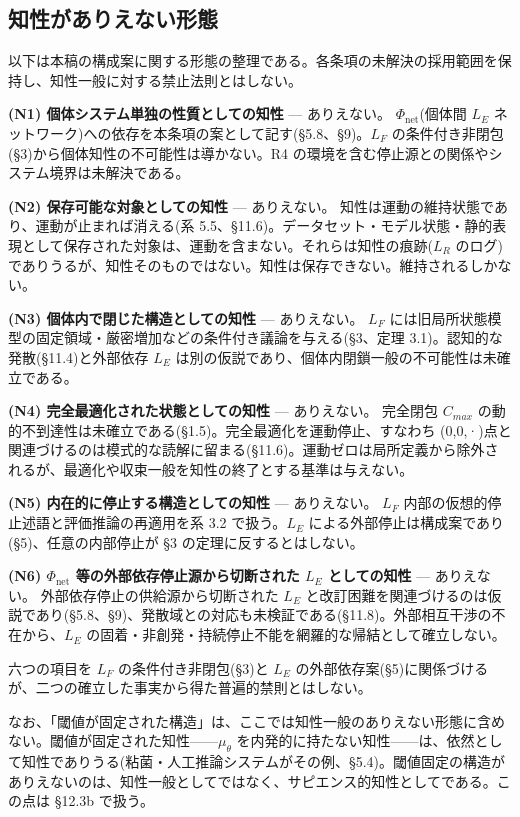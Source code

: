 \bigskip


\subsection{知性がありえない形態}


以下は本稿の構成案に関する形態の整理である。各条項の未解決の採用範囲を保持し、知性一般に対する禁止法則とはしない。

\textbf{(N1) 個体システム単独の性質としての知性} — ありえない。
$\Phi_{\text{net}}$(個体間 $L_E$ ネットワーク)への依存を本条項の案として記す(\S{}5.8、\S{}9)。$L_F$ の条件付き非閉包(\S{}3)から個体知性の不可能性は導かない。R4 の環境を含む停止源との関係やシステム境界は未解決である。

\textbf{(N2) 保存可能な対象としての知性} — ありえない。
知性は運動の維持状態であり、運動が止まれば消える(系 5.5、\S{}11.6)。データセット・モデル状態・静的表現として保存された対象は、運動を含まない。それらは知性の痕跡($L_R$ のログ)でありうるが、知性そのものではない。知性は保存できない。維持されるしかない。

\textbf{(N3) 個体内で閉じた構造としての知性} — ありえない。
$L_F$ には旧局所状態模型の固定領域・厳密増加などの条件付き議論を与える(\S{}3、定理 3.1)。認知的な発散(\S{}11.4)と外部依存 $L_E$ は別の仮説であり、個体内閉鎖一般の不可能性は未確立である。

\textbf{(N4) 完全最適化された状態としての知性} — ありえない。
完全閉包 $C_{max}$ の動的不到達性は未確立である(\S{}1.5)。完全最適化を運動停止、すなわち (0,0,·)点と関連づけるのは模式的な読解に留まる(\S{}11.6)。運動ゼロは局所定義から除外されるが、最適化や収束一般を知性の終了とする基準は与えない。

\textbf{(N5) 内在的に停止する構造としての知性} — ありえない。
$L_F$ 内部の仮想的停止述語と評価推論の再適用を系 3.2 で扱う。$L_E$ による外部停止は構成案であり(\S{}5)、任意の内部停止が \S{}3 の定理に反するとはしない。

\textbf{(N6) $\Phi_{\text{net}}$ 等の外部依存停止源から切断された $L_E$ としての知性} — ありえない。
外部依存停止の供給源から切断された $L_E$ と改訂困難を関連づけるのは仮説であり(\S{}5.8、\S{}9)、発散域との対応も未検証である(\S{}11.8)。外部相互干渉の不在から、$L_E$ の固着・非創発・持続停止不能を網羅的な帰結として確立しない。

六つの項目を $L_F$ の条件付き非閉包(\S{}3)と $L_E$ の外部依存案(\S{}5)に関係づけるが、二つの確立した事実から得た普遍的禁則とはしない。

なお、「閾値が固定された構造」は、ここでは知性一般のありえない形態に含めない。閾値が固定された知性——$\mu_\theta$ を内発的に持たない知性——は、依然として知性でありうる(粘菌・人工推論システムがその例、\S{}5.4)。閾値固定の構造がありえないのは、知性一般としてではなく、サピエンス的知性としてである。この点は \S{}12.3b で扱う。

